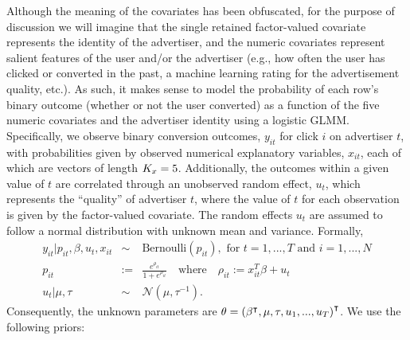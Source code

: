 \documentclass{article}\usepackage[]{graphicx}\usepackage[]{color}
\theoremstyle{plain}
\theoremstyle{definition}
\theoremstyle{plain}
\theoremstyle{plain}
\theoremstyle{plain}
\theoremstyle{plain}
\begin{document}
Although the meaning of the covariates has been obfuscated, for the
purpose of discussion we will imagine that the single retained factor-valued
covariate represents the identity of the advertiser, and the numeric
covariates represent salient features of the user and/or the advertiser
(e.g., how often the user has clicked or converted in the past, a
machine learning rating for the advertisement quality, etc.). As such,
it makes sense to model the probability of each row's binary outcome
(whether or not the user converted) as a function of the five numeric
covariates and the advertiser identity using a logistic GLMM. Specifically,
we observe binary conversion outcomes, $y_{it}$ for click $i$ on
advertiser $t$, with probabilities given by observed numerical explanatory
variables, $x_{it}$, each of which are vectors of length $K_{x}=5$.
Additionally, the outcomes within a given value of $t$ are correlated
through an unobserved random effect, $u_{t}$, which represents the
``quality'' of advertiser $t$, where the value of $t$ for each
observation is given by the factor-valued covariate. The random effects
$u_{t}$ are assumed to follow a normal distribution with unknown
mean and variance. Formally,
\begin{eqnarray*}
y_{it}\vert p_{it},\beta,u_{t},x_{it} & \sim & \textrm{Bernoulli}\left(p_{it}\right),\textrm{ for }t=1,...,T\textrm{ and }i=1,...,N\\
p_{it} & := & \frac{e^{\rho_{it}}}{1+e^{\rho_{it}}}\quad\textrm{where}\quad\rho_{it}:=x_{it}^{T}\beta+u_{t}\\
u_{t}\vert\mu,\tau & \sim & \mathcal{N}\left(\mu,\tau^{-1}\right).
\end{eqnarray*}
Consequently, the unknown parameters are $\theta=\left(\beta^{\intercal},\mu,\tau,u_{1},...,u_{T}\right)^{\intercal}$.
We use the following priors:
\end{document}
